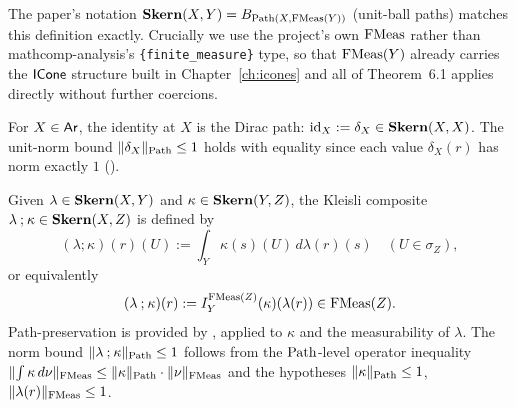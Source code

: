 \begin{remark}
The paper's notation $\mathbf{Skern}(X, Y) = B_{\mathrm{Path}(X, \mathrm{FMeas}(Y))}$
(unit-ball paths) matches this definition exactly. Crucially we use
the project's own $\mathrm{FMeas}$ rather than mathcomp-analysis's
\texttt{\{finite\_measure\}} type, so that $\mathrm{FMeas}(Y)$ already
carries the $\mathsf{ICone}$ structure built in Chapter~\ref{ch:icones} and
all of Theorem~6.1 applies directly without further coercions.
\end{remark}

\begin{definition}\label{def:skern-id}%
\rocqok\mathcompok
{}%
For $X \in \mathsf{Ar}$, the identity at $X$ is the Dirac path:
$\mathrm{id}_X := \delta_X \in \mathbf{Skern}(X, X)$. The unit-norm bound
$\lVert \delta_X \rVert_{\mathrm{Path}} \le 1$ holds with equality since each value
$\delta_X(r)$ has norm exactly $1$
().
\end{definition}

\begin{definition}\label{def:skern-comp}%
\rocqok\mathcompok
{}%
Given $\lambda \in \mathbf{Skern}(X, Y)$ and $\kappa \in \mathbf{Skern}(Y, Z)$, the
Kleisli composite $\lambda \mathbin{;} \kappa \in \mathbf{Skern}(X, Z)$ is
defined by
\[
  (\lambda \mathbin{;} \kappa)(r)(U) := \int_Y \kappa(s)(U)\,d\lambda(r)(s)
  \quad (U \in \sigma_Z),
\]
or equivalently
\[
  (\lambda \mathbin{;} \kappa)(r) := I^{\mathrm{FMeas}(Z)}_Y(\kappa)(\lambda(r))
  \in \mathrm{FMeas}(Z).
\]
Path-preservation is provided by
, applied to
$\kappa$ and the measurability of $\lambda$. The norm bound
$\lVert \lambda \mathbin{;} \kappa \rVert_{\mathrm{Path}} \le 1$ follows from the
$\mathrm{Path}$-level operator inequality
$\lVert \int \kappa\,d\nu \rVert_{\mathrm{FMeas}} \le \lVert \kappa \rVert_{\mathrm{Path}}
\cdot \lVert \nu \rVert_{\mathrm{FMeas}}$ and the hypotheses
$\lVert \kappa \rVert_{\mathrm{Path}} \le 1$, $\lVert \lambda(r) \rVert_{\mathrm{FMeas}} \le 1$.
\end{definition}

